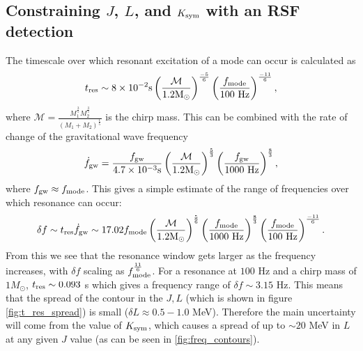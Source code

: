 \documentclass[fleqn,usenatbib]{mnras}
\begin{document}
\subsection{Constraining $J$, $L$, and $K_{\rm sym}$ with an RSF detection}
\hspace{\parindent}The timescale over which resonant excitation of a mode can occur is calculated as \cite{tsang2012resonant}
\begin{align}
t_{\rm res}\sim 8\times10^{-2}\text{s}\left(\frac{\mathcal{M}}{1.2\text{M}_{\odot}}\right)^{\frac{-5}{6}}\left(\frac{f_{\rm mode}}{100 \text{ Hz}}\right)^{\frac{-11}{6}},
\label{res_timescale}    
\end{align}
\noindent where $\mathcal{M}=\frac{M_1^{\frac{3}{5}}M_2^{\frac{3}{5}}}{(M_1+M_2)^{\frac{1}{5}}}$ is the chirp mass. This can be combined with the rate of change of the gravitational wave frequency
\begin{align}
\Dot{f}_{\rm gw}=\frac{f_{\rm gw}}{4.7\times10^{-3}\text{s}}\left(\frac{\mathcal{M}}{1.2\text{M}_{\odot}}\right)^{\frac{5}{3}}\left(\frac{f_{\rm gw}}{1000 \text{ Hz}}\right)^{\frac{8}{3}},
\label{res_timescale}    
\end{align}
\noindent where $f_{\rm gw}\approx f_{\rm mode}$. This gives a simple estimate of the range of frequencies over which resonance can occur:
\begin{align}
\delta f\sim t_{\rm res}\Dot{f}_{\rm gw}\sim17.02f_{\rm mode}\left(\frac{\mathcal{M}}{1.2\text{M}_{\odot}}\right)^{\frac{5}{6}}\left(\frac{f_{\rm mode}}{1000 \text{ Hz}}\right)^{\frac{8}{3}}\left(\frac{f_{\rm mode}}{100 \text{ Hz}}\right)^{\frac{-11}{6}}.
\label{res_timescale}    
\end{align}
\noindent From this we see that the resonance window gets larger as the frequency increases, with $\delta f$ scaling as $f_{\rm mode}^{\frac{11}{6}}$. For a resonance at $100$ Hz and a chirp mass of $1M_{\odot}$, $t_{\rm res}\sim 0.093$ s which gives a frequency range of $\delta f\sim 3.15$ Hz. This means that the spread of the contour in the $J,L$ (which is shown in figure \ref{fig:t_res_spread}) is small ($\delta L\approx 0.5-1.0$ MeV). Therefore the main uncertainty will come from the value of $K_{\rm sym}$, which causes a spread of up to $\sim 20$ MeV in $L$ at any given $J$ value (as can be seen in \ref{fig:freq_contours}).
\end{document}
